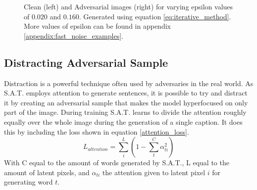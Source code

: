 \begin{figure}
    \centering
    \vspace{\floatsep}
    \caption{Clean (left) and Adversarial images (right) for varying epsilon values of $0.020$ and $0.160$. Generated using equation \ref{eq:iterative_method}. More values of epsilon can be found in appendix \ref{appendix:fast_noise_examples}.}
    \label{fig:iterative_noise_examples}
\end{figure}


\subsection*{Distracting Adversarial Sample}
Distraction is a powerful technique often used by adversaries in the real world. As S.A.T. employs attention to generate sentences, it is possible to try and distract it by creating an adversarial sample that makes the model hyperfocused on only part of the image. During training S.A.T. learns to divide the attention roughly equally over the whole image during the generation of a single caption. It does this by including the loss shown in equation \ref{attention_loss}.
\begin{equation}
    L_{attention} = \sum^{L}_i (1 - \sum^{C}_{t} \alpha_{ti}^2)
    \label{attention_loss}
\end{equation}
\noindent With C equal to the amount of words generated by S.A.T., L equal to the amount of latent pixels, and $\alpha_{ti}$ the attention given to latent pixel $i$ for generating word $t$.

